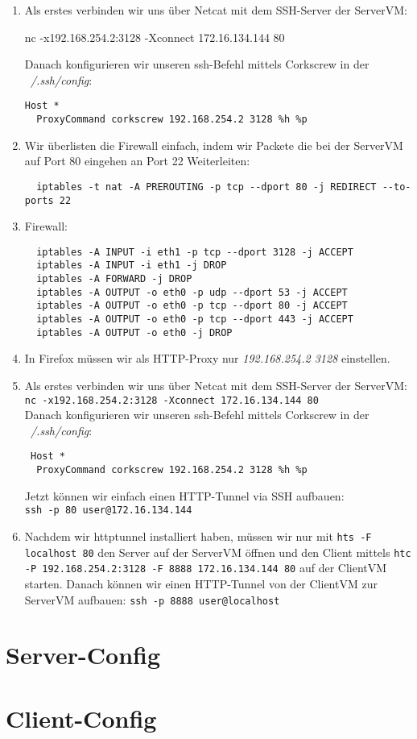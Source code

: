 \documentclass{scrartcl}
\begin{document}
\begin{enumerate}[\bfseries 1.]
	\item
        Als erstes verbinden wir uns über Netcat mit dem SSH-Server der ServerVM:
        \begin{usercommands}
nc -x192.168.254.2:3128 -Xconnect 172.16.134.144 80
        \end{usercommands}
		Danach konfigurieren wir unseren ssh-Befehl mittels Corkscrew in der
		\textit{~/.ssh/config}:\\
		\begin{lstlisting}
Host *
  ProxyCommand corkscrew 192.168.254.2 3128 %h %p
		\end{lstlisting}
		\item Wir überlisten die Firewall einfach, indem wir Packete die bei der
		      ServerVM auf Port 80 eingehen an Port 22 Weiterleiten:
		      \begin{lstlisting}
  iptables -t nat -A PREROUTING -p tcp --dport 80 -j REDIRECT --to-ports 22
		\end{lstlisting}
		\item Firewall:
		      \begin{lstlisting}
  iptables -A INPUT -i eth1 -p tcp --dport 3128 -j ACCEPT
  iptables -A INPUT -i eth1 -j DROP
  iptables -A FORWARD -j DROP
  iptables -A OUTPUT -o eth0 -p udp --dport 53 -j ACCEPT
  iptables -A OUTPUT -o eth0 -p tcp --dport 80 -j ACCEPT
  iptables -A OUTPUT -o eth0 -p tcp --dport 443 -j ACCEPT
  iptables -A OUTPUT -o eth0 -j DROP
		\end{lstlisting}
		\item In Firefox müssen wir als HTTP-Proxy nur \textit{192.168.254.2
			3128} einstellen.
			\item
			      Als erstes verbinden wir uns über Netcat mit dem SSH-Server der ServerVM:\\
			      \texttt{nc -x192.168.254.2:3128 -Xconnect 172.16.134.144 80}\\
			      Danach konfigurieren wir unseren ssh-Befehl mittels Corkscrew in der
			      \textit{~/.ssh/config}:\\
			      \begin{lstlisting}
 Host *
  ProxyCommand corkscrew 192.168.254.2 3128 %h %p
			\end{lstlisting}
			Jetzt können wir einfach einen HTTP-Tunnel via SSH aufbauen:\\
			\texttt{ssh -p 80 user@172.16.134.144}
			\item Nachdem wir httptunnel installiert haben, müssen wir nur mit
			      \texttt{hts -F localhost 80} den Server auf der ServerVM öffnen und
			      den Client mittels \texttt{htc -P 192.168.254.2:3128 -F 8888
			      172.16.134.144 80} auf der ClientVM starten. Danach können wir einen
			      HTTP-Tunnel von der ClientVM zur ServerVM aufbauen:
			      \texttt{ssh -p 8888 user@localhost}
		\end{enumerate}

    \begin{appendices}
      \section{Server-Config}
      
      \section{Client-Config}
      
  \end{appendices}
\end{document}
